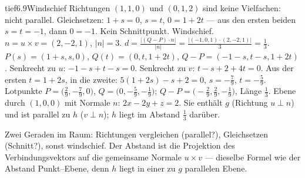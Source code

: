 \begin{loesungkarte}{tief}{6.9}{Windschief}
Richtungen $(1, 1, 0)$ und $(0, 1, 2)$ sind keine Vielfachen: nicht parallel. Gleichsetzen: $1 + s = 0$, $s = t$, $0 = 1 + 2t$ --- aus den ersten beiden $s = t = -1$, dann $0 = -1$. Kein Schnittpunkt. Windschief.
$n = u\times v = (2, -2, 1)$, $|n| = 3$. $d = \frac{|(Q - P)\cdot n|}{|n|} = \frac{|(-1, 0, 1)\cdot(2, -2, 1)|}3 = \frac13$.
$P(s) = (1 + s, s, 0)$, $Q(t) = (0, t, 1 + 2t)$, $Q - P = (-1 - s, t - s, 1 + 2t)$. Senkrecht zu $u$: $-1 - s + t - s = 0$. Senkrecht zu $v$: $t - s + 2 + 4t = 0$. Aus der ersten $t = 1 + 2s$, in die zweite: $5(1 + 2s) - s + 2 = 0$, $s = -\frac79$, $t = -\frac59$. Lotpunkte $P = \bigl(\frac29, -\frac79, 0\bigr)$, $Q = \bigl(0, -\frac59, -\frac19\bigr)$; $Q - P = \bigl(-\frac29, \frac29, -\frac19\bigr)$, Länge $\frac13$. \checkmark
{}
Ebene durch $(1, 0, 0)$ mit Normale $n$: $2x - 2y + z = 2$. Sie enthält $g$ (Richtung $u\perp n$) und ist parallel zu $h$ ($v\perp n$); $h$ liegt im Abstand $\frac13$ darüber.
\begin{mitnehmen}\kastentext
Zwei Geraden im Raum: Richtungen vergleichen (parallel?), Gleichsetzen (Schnitt?), sonst windschief. Der Abstand ist die Projektion des Verbindungsvektors auf die gemeinsame Normale $u\times v$ --- dieselbe Formel wie der Abstand Punkt--Ebene, denn $h$ liegt in einer zu $g$ parallelen Ebene.
\end{mitnehmen}
\end{loesungkarte}

